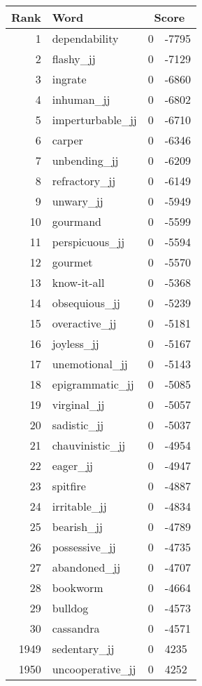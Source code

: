 \begin{longtable}[!htbp]{| rlr@{.}l |}
    \hline
    \textbf{Rank} & \textbf{Word} & \multicolumn{2}{c|}{\textbf{Score}} \\
    \hline
    \endhead
    1 & dependability & 0 & -7795 \\
    2 & flashy\_jj & 0 & -7129 \\
    3 & ingrate & 0 & -6860 \\
    4 & inhuman\_jj & 0 & -6802 \\
    5 & imperturbable\_jj & 0 & -6710 \\
    6 & carper & 0 & -6346 \\
    7 & unbending\_jj & 0 & -6209 \\
    8 & refractory\_jj & 0 & -6149 \\
    9 & unwary\_jj & 0 & -5949 \\
    10 & gourmand & 0 & -5599 \\
    11 & perspicuous\_jj & 0 & -5594 \\
    12 & gourmet & 0 & -5570 \\
    13 & know-it-all & 0 & -5368 \\
    14 & obsequious\_jj & 0 & -5239 \\
    15 & overactive\_jj & 0 & -5181 \\
    16 & joyless\_jj & 0 & -5167 \\
    17 & unemotional\_jj & 0 & -5143 \\
    18 & epigrammatic\_jj & 0 & -5085 \\
    19 & virginal\_jj & 0 & -5057 \\
    20 & sadistic\_jj & 0 & -5037 \\
    21 & chauvinistic\_jj & 0 & -4954 \\
    22 & eager\_jj & 0 & -4947 \\
    23 & spitfire & 0 & -4887 \\
    24 & irritable\_jj & 0 & -4834 \\
    25 & bearish\_jj & 0 & -4789 \\
    26 & possessive\_jj & 0 & -4735 \\
    27 & abandoned\_jj & 0 & -4707 \\
    28 & bookworm & 0 & -4664 \\
    29 & bulldog & 0 & -4573 \\
    30 & cassandra & 0 & -4571 \\
    1949 & sedentary\_jj & 0 & 4235 \\
    1950 & uncooperative\_jj & 0 & 4252 \\

\end{longtable}
